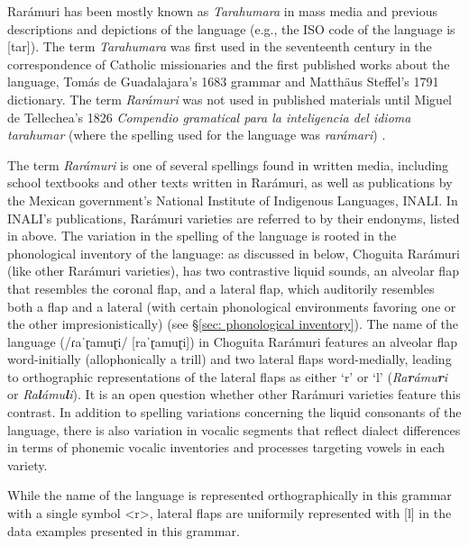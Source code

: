 Rarámuri has been mostly known as \textit{Tarahumara} in mass media and previous descriptions and depictions of the language (e.g., the ISO code of the language is [tar]). The term \textit{Tarahumara} was first used in the seventeenth century in the correspondence of Catholic missionaries and the first published works about the language, Tomás de Guadalajara’s 1683 grammar and Matthäus Steffel’s 1791 dictionary. The term \textit{Rarámuri} was not used in published materials until Miguel de Tellechea’s 1826 \textit{Compendio gramatical para la inteligencia del idioma tarahumar} (where the spelling used for the language was \textit{rarámari}) \citep[][77]{merrill2001identidad}.

The term \textit{Rarámuri} is one of several spellings found in written media, including school textbooks and other texts written in Rarámuri, as well as publications by the Mexican government's National Institute of Indigenous Languages, INALI. In INALI's publications, Rarámuri varieties are referred to by their endonyms, listed in  above. The variation in the spelling of the language is rooted in the phonological inventory of the language: as discussed in  below, Choguita Rarámuri (like other Rarámuri varieties), has two contrastive liquid sounds, an alveolar flap that resembles the  coronal flap, and a lateral flap, which auditorily resembles both a flap and a lateral (with certain phonological environments favoring one or the other impresionistically) (see §\ref{sec: phonological inventory}). The name of the language (/ɾaˈɽamuɽi/ [raˈɽamuɽi]) in Choguita Rarámuri features an alveolar flap word-initially (allophonically a trill) and two lateral flaps word-medially, leading to orthographic representations of the lateral flaps as either ‘r’ or ‘l’ (\textit{Ra}\textbf{\textit{r}}\textit{ámu}\textbf{\textit{r}}\textit{i} or \textit{Ra}\textbf{\textit{l}}\textit{ámu}\textbf{\textit{l}}\textit{i}). It is an open question whether other Rarámuri varieties feature this contrast. In addition to spelling variations concerning the liquid consonants of the language, there is also variation in vocalic segments that reflect dialect differences in terms of phonemic vocalic inventories and processes targeting vowels in each variety.

While the name of the language is represented orthographically in this grammar with a single symbol <r>, lateral flaps are uniformily represented with [l] in the data examples presented in this grammar.

